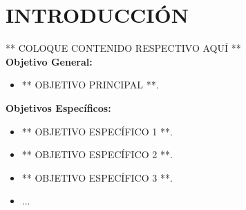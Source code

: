 \chapter*{INTRODUCCIÓN}
\thispagestyle{empty}

** COLOQUE CONTENIDO RESPECTIVO AQUÍ **\\

\textbf{Objetivo General:}

\begin{itemize}
    \item ** OBJETIVO PRINCIPAL **.
\end{itemize}

\textbf{Objetivos Específicos:}

\begin{itemize}
    \item ** OBJETIVO ESPECÍFICO 1 **.
    \item ** OBJETIVO ESPECÍFICO 2 **.
    \item ** OBJETIVO ESPECÍFICO 3 **.
    \item ...
\end{itemize}